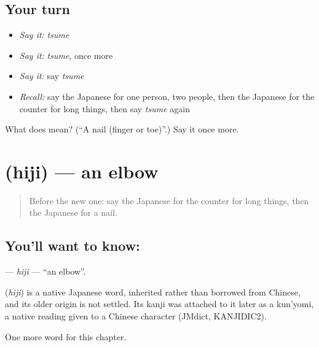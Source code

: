 \subsection*{Your turn}
\begin{itemize}
\raggedright
  \item \emph{Say it:} \emph{tsume}
  \item \emph{Say it:} \emph{tsume}, once more
  \item \emph{Say it:} say \emph{tsume}
  \item \emph{Recall:} say the Japanese for one person, two people, then the Japanese for the counter for long things, then say \emph{tsume} again
\end{itemize}

\begin{tcolorbox}[breakable,colback=teal!4,colframe=teal!35!black,title={Before you move on}]
What does  mean? (\textquotedblleft{}A nail (finger or toe)\textquotedblright{}.) Say it once more.
\end{tcolorbox}
\section[\texorpdfstring{\ja{ひじ} (hiji)}{ひじ (hiji)}]{ (hiji) — an elbow}

\label{lesson:JA-C20-hiji}



\begin{quote}
Before the new one: say the Japanese for the counter for long things, then the Japanese for a nail.
\end{quote}

\subsection*{You'll want to know: }
\textbf{} — \emph{hiji} — \textquotedblleft{}an elbow\textquotedblright{}.

\begin{cousinweb}
\textbf{} (\emph{hiji}) is a native Japanese word, inherited rather than borrowed from Chinese, and its older origin is not settled. Its kanji was attached to it later as a kun'yomi, a native reading given to a Chinese character (JMdict, KANJIDIC2).
\end{cousinweb}

\begin{grammarlens}[title={What you've built}]
One more word for this chapter.
\end{grammarlens}


